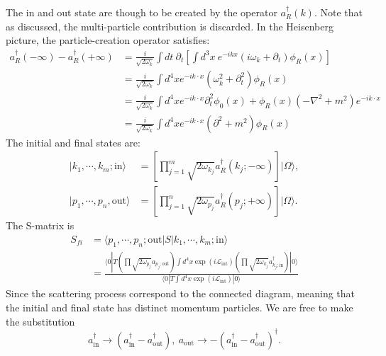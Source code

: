 The in and out state are though to be created by the operator $a_R^\dagger(k)$.
Note that as discussed, the multi-particle contribution is discarded.
In the Heisenberg picture, the particle-creation operator satisfies:
\begin{equation}
\begin{aligned}
	a_{R}^\dagger(-\infty) - a_{R}^\dagger(+\infty)
	&= \frac{i}{\sqrt{2\omega_k}} \int dt\ \partial_t \left[\int d^{3}x\ e^{-ikx}(i\omega_k+\partial_t)\phi_R(x)\right] \\
	&= \frac{i}{\sqrt{2\omega_k}} \int d^4 x e^{-ik\cdot x}(\omega_k^2+\partial_t^2)\phi_R(x) \\
	&= \frac{i}{\sqrt{2\omega_k}} \int d^4 x e^{-ik\cdot x}\partial_t^2\phi_0(x) + \phi_R(x)(-\nabla^2+m^2)e^{-i k\cdot x} \\
	&= \frac{i}{\sqrt{2\omega_k}} \int d^4 x e^{-ik\cdot x}(\partial^2+m^2)\phi_R(x)
\end{aligned}
\end{equation}
The initial and final states are:
\begin{equation}
\begin{aligned}
	|k_1, \cdots, k_m; \mathrm{in}\rangle &= \left[\prod_{j=1}^m \sqrt{2\omega_{k_j}} a^\dagger_{R}(k_j;-\infty)\right] |\Omega\rangle, \\
	|p_1, \cdots, p_n, \mathrm{out}\rangle &= \left[\prod_{j=1}^n \sqrt{2\omega_{p_j}}a^\dagger_{R}(p_j;+\infty)\right] |\Omega\rangle.
\end{aligned}
\end{equation}
The S-matrix is
\begin{equation*}
\begin{aligned}
	S_{fi} &= \langle p_1, \cdots, p_n;\mathrm{out}| S |k_1, \cdots, k_m; \mathrm{in}\rangle \\
	&= \frac{\langle 0|T 
		\left(\prod \sqrt{2\omega_{p_j}} a_{p_j;\mathrm{out}} \right)
		\int d^4 x \exp(i\mathcal{L}_{\mathrm{int}})
		\left(\prod \sqrt{2\omega_{k_j}} a^\dagger_{k_j;\mathrm{in}} \right)|0\rangle}
		{\langle 0|T\int d^4 x \exp(i\mathcal{L}_{\mathrm{int}})|0\rangle}
\end{aligned}
\end{equation*}
Since the scattering process correspond to the connected diagram, meaning that the initial and final state has distinct momentum particles.
We are free to make the substitution
\begin{equation*}
	a^\dagger_{\mathrm{in}} \rightarrow (a_{\mathrm{in}}^\dagger - a_{\mathrm{out}}^\dagger),\ 
	a_{\mathrm{out}} \rightarrow -(a_{\mathrm{in}}^\dagger - a_{\mathrm{out}}^\dagger)^\dagger.
\end{equation*}
